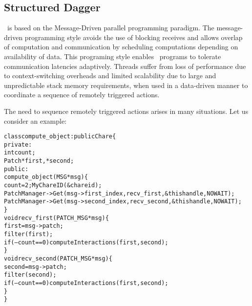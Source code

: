 \subsection{Structured Dagger}
\label{sec:sdag}

\charmpp\ is based on the Message-Driven parallel programming paradigm.  The
message-driven programming style avoids the use of blocking receives and
allows overlap of computation and communication by scheduling computations
depending on availability of data.  This programing style enables \charmpp\
programs to tolerate communication latencies adaptively. Threads suffer from
loss of performance due to context-switching overheads and limited scalability
due to large and unpredictable stack memory requirements, when used in a
data-driven manner to coordinate a sequence of remotely triggered actions.

The need to sequence remotely triggered actions
arises in many situations. Let us consider an example:

\begin{center}
\begin{alltt}
      class compute_object : public Chare \{
      private:
      int         count;
      Patch       *first, *second;
      public:
      compute_object(MSG *msg) \{
      count = 2; MyChareID(\&chareid);
      PatchManager->Get(msg->first_index, recv_first, \&thishandle,NOWAIT);
      PatchManager->Get(msg->second_index, recv_second, \&thishandle,NOWAIT);
      \}
      void recv_first(PATCH_MSG *msg) \{
       first = msg->patch;
       filter(first);
       if (--count == 0 ) computeInteractions(first,second);
      \} 
      void recv_second(PATCH_MSG *msg)\{
       second = msg->patch;
       filter(second);
       if (--count == 0) computeInteractions(first,second);
      \}
     \}
\end{alltt}
\end{center}


